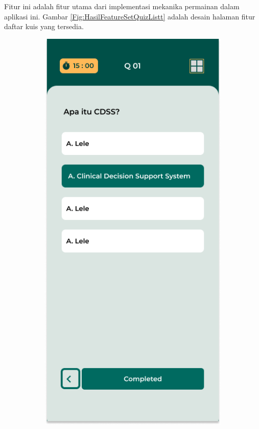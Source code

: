 Fitur ini adalah fitur utama dari implementasi mekanika permainan dalam aplikasi ini. Gambar \ref*{Fig:HasilFeatureSetQuizListt} adalah desain halaman fitur daftar kuis yang tersedia.
\begin{figure}[H]
	\centering
	\begin{subfigure}[b]{0.23\textwidth}
		\centering
	  \includegraphics[width=\linewidth]{contents/chapter-3/images/HF-kuis1.png}

\end{subfigure}
\end{figure}
